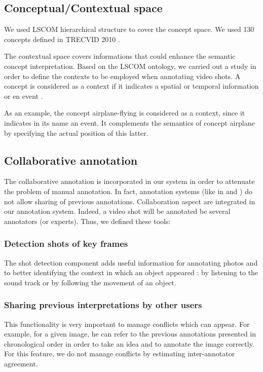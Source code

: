 \subsection{Conceptual/Contextual space}
We used LSCOM hierarchical structure to cover the concept space. We used 130 concepts defined in TRECVID 2010 \cite{phd::Oomen2013}.

The contextual space covers informations that could enhance the semantic concept interpretation. Based on the LSCOM ontology, we carried out a study in order to define the contexts to be employed when annotating video shots. A concept is considered as a context if it indicates a spatial or temporal information or en event \cite{Brilhault2009}.

As an example, the concept airplane-flying is considered as a context, since it indicates in its name an event. It complements the semantics of concept airplane by specifying the actual position of this latter.

\subsection{Collaborative annotation}
The collaborative annotation is incorporated in our system in order to attenuate the problem of manual annotation. In fact, annotation systems (like in \cite{Ayache2007}  and \cite{Volkmer2005}) do not allow sharing of previous annotations. Collaboration aspect are integrated in our annotation system. Indeed, a video shot will be annotated be several annotators (or experts). Thus, we defined these tools:

\subsubsection{Detection shots of key frames}
The shot detection component adds useful information for annotating photos and to better identifying the context in which an object appeared : by listening to the sound track or by following the movement of an object.

	\subsubsection{Sharing previous interpretations by other users}
This functionality is very important to manage conflicts
which can appear. For example, for a given image, he can
refer to the previous annotations presented in chronological
order in order to take an idea and to annotate the image correctly. For this feature, we do not manage conflicts \cite{Ksibi2011} by
estimating inter-annotator agreement.
